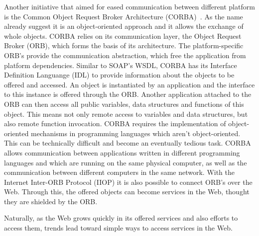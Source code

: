 Another initiative that aimed for eased communication between different platform is the Common Object Request Broker Architecture (CORBA)~\cite{dec1991common}.
As the name already suggest it is an object-oriented approach and it allows the exchange of whole objects.
CORBA relies on its communication layer, the Object Request Broker (ORB), which forms the basis of its architecture.
The platform-specific ORB's provide the communication abstraction, which free the application from platform dependencies.
Similar to SOAP's WSDL, CORBA has its Interface Definition Languange (IDL) to provide information about the objects to be offered and accessed.
An object is instantiated by an application and the interface to this instance is offered through the ORB.
Another application attached to the ORB can then access all public variables, data structures and functions of this object.
This means not only remote access to variables and data structures, but also remote function invocation.
CORBA requires the implementation of object-oriented mechanisms in programming languages which aren't object-oriented.
This can be technically difficult and become an eventually tedious task.
CORBA allows communication between applications written in different programming languages and which are running on the same physical computer, as well as the communication between different computers in the same network.
With the Internet Inter-ORB Protocol (IIOP) it is also possible to connect ORB's over the Web.
Through this, the offered objects can become services in the Web, thought they are shielded by the ORB.



Naturally, as the Web grows quickly in its offered services and also efforts to access them, trends lead toward simple ways to access services in the Web.


